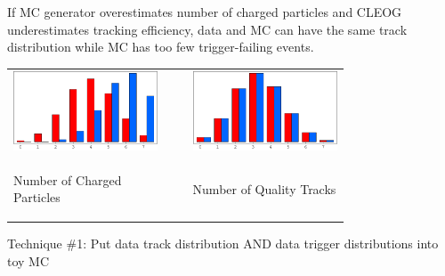 \documentclass[landscape]{article}
\begin{document}
If MC generator overestimates number of charged particles and CLEOG
underestimates tracking efficiency, data and MC can have the same track
distribution while MC has too few trigger-failing events.

\begin{center}
  \begin{tabular}{p{0.35\linewidth} p{0.05\linewidth} p{0.35\linewidth}}
    \includegraphics[width=\linewidth]{effcheck_datavmc1.pdf} & &
    \includegraphics[width=\linewidth]{effcheck_datavmc2.pdf} \\
    \begin{center} \vspace{-1 cm} Number of Charged Particles \end{center} & &
    \begin{center} \vspace{-1 cm} Number of Quality Tracks \end{center}
  \end{tabular}
\end{center}

Technique \#1:  Put data track distribution AND data trigger distributions into toy MC
\end{document}
